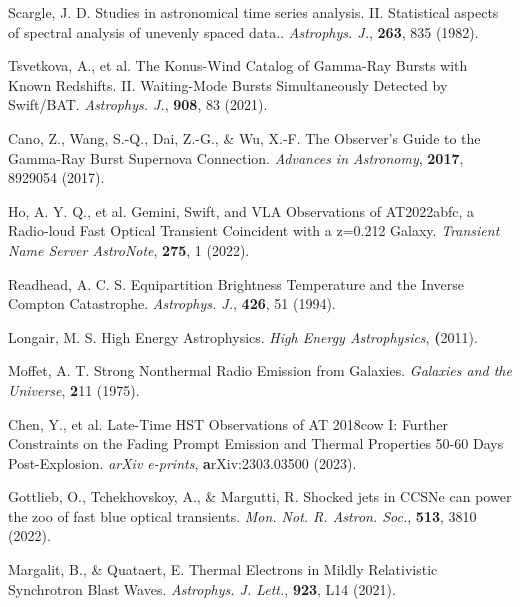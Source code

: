 \documentclass{nature_plusfigure}
\newcommand{\mn}{{Mon. Not. R. Astron. Soc.}}
\newcommand{\mnras}{\mn}
\newcommand{\apj}{{Astrophys. J.}}
\newcommand{\apjl}{{Astrophys. J. Lett.}}
\begin{document}
\begin{methods}
\begin{thebibliography}{10}
 Scargle, J. D. Studies in astronomical time series analysis. II. Statistical aspects of spectral analysis of unevenly spaced data.. \emph{\apj}, \textbf{263}, 835 (1982). 


 Tsvetkova, A., et al. The Konus-Wind Catalog of Gamma-Ray Bursts with Known Redshifts. II. Waiting-Mode Bursts Simultaneously Detected by Swift/BAT. \emph{\apj}, \textbf{908}, 83 (2021). 

 Cano, Z., Wang, S.-Q., Dai, Z.-G., \& Wu, X.-F. The Observer's Guide to the Gamma-Ray Burst Supernova Connection. \emph{Advances in Astronomy}, \textbf{2017}, 8929054 (2017). 


 Ho, A. Y. Q., et al. Gemini, Swift, and VLA Observations of AT2022abfc, a Radio-loud Fast Optical Transient Coincident with a z=0.212 Galaxy. \emph{Transient Name Server AstroNote}, \textbf{275}, 1 (2022). 


 Readhead, A. C. S. Equipartition Brightness Temperature and the Inverse Compton Catastrophe. \emph{\apj}, \textbf{426}, 51 (1994). 

 Longair, M. S. High Energy Astrophysics. \emph{High Energy Astrophysics}, \textbf (2011). 

 Moffet, A. T. Strong Nonthermal Radio Emission from Galaxies. \emph{Galaxies and the Universe}, \textbf 211 (1975). 


 Chen, Y., et al. Late-Time HST Observations of AT 2018cow I: Further Constraints on the Fading Prompt Emission and Thermal Properties 50-60 Days Post-Explosion. \emph{arXiv e-prints}, \textbf arXiv:2303.03500 (2023). 

 Gottlieb, O., Tchekhovskoy, A., \& Margutti, R. Shocked jets in CCSNe can power the zoo of fast blue optical transients. \emph{\mnras}, \textbf{513}, 3810 (2022). 


 Margalit, B., \& Quataert, E. Thermal Electrons in Mildly Relativistic Synchrotron Blast Waves. \emph{\apjl}, \textbf{923}, L14 (2021). 


\end{thebibliography}
\end{methods}
\end{document}
